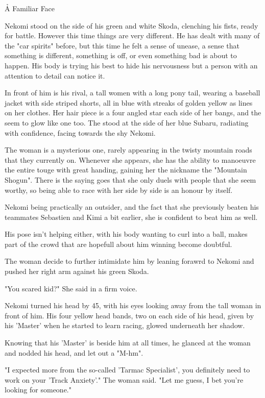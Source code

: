 \h{A Familiar Face}

Nekomi stood on the side of his green and white Skoda, clenching his fists, ready for battle. However this time things are very different. He has dealt with many of the "car spirits" before, but this time he felt a sense of unease, a sense that something is different, something is off, or even something bad is about to happen. His body is trying his best to hide his nervousness but a person with an attention to detail can notice it.

In front of him is his rival, a tall women with a long pony tail, wearing a baseball jacket with side striped shorts, all in blue with streaks of golden yellow as lines on her clothes. Her hair piece is a four angled star each side of her bangs, and the seem to glow like one too. The stood at the side of her blue Subaru, radiating with confidence, facing towards the shy Nekomi.

The woman is a mysterious one, rarely appearing in the twisty mountain roads that they currently on. Whenever she appears, she has the ability to manoeuvre the entire touge with great handing, gaining her the nickname the "Mountain Shogun". There is the saying goes that she only duels with people that she seem worthy, so being able to race with her side by side is an honour by itself.

Nekomi being practically an outsider, and the fact that she previously beaten his teammates Sebastien and Kimi a bit earlier, she is confident to beat him as well.

His pose isn't helping either, with his body wanting to curl into a ball, makes part of the crowd that are hopefull about him winning become doubtful.

The woman decide to further intimidate him by leaning forawrd to Nekomi and pushed her right arm against his green Skoda.

"You scared kid?" She said in a firm voice.

Nekomi turned his head by 45\textdegree, with his eyes looking away from the tall woman in front of him. His four yellow head bands, two on each side of his head, given by his 'Master' when he started to learn racing, glowed underneath her shadow.

Knowing that his 'Master' is beside him at all times, he glanced at the woman and nodded his head, and let out a "M-hm".

"I expected more from the so-called 'Tarmac Specialist', you definitely need to work on your 'Track Anxiety'." The woman said. "Let me guess, I bet you're looking for someone."

